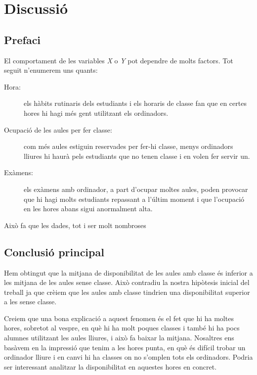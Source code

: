 \section{Discussió}
\subsection{Prefaci}
El comportament de les variables \emph{X} o \emph{Y} pot dependre de molts factors. Tot seguit n'enumerem uns quants:
\begin{description}
	\item[Hora:] els hàbits rutinaris dels estudiants i els horaris de classe fan que en certes hores hi hagi més gent utilitzant els ordinadors.
	\item[Ocupació de les aules per fer classe:] com més aules estiguin reservades per fer-hi classe, menys ordinadors lliures hi haurà pels estudiants que no tenen classe i en volen fer servir un.
	\item[Exàmens:] els exàmens amb ordinador, a part d'ocupar moltes aules, poden provocar que hi hagi molts estudiants repassant a l'últim moment i que l'ocupació en les hores abans sigui anormalment alta.
\end{description}
Això fa que les dades, tot i ser molt nombroses

\subsection{Conclusió principal}
Hem obtingut que la mitjana de disponibilitat de les aules amb classe és inferior a les mitjana de les aules sense classe. Això contradiu la nostra hipòtesis inicial del treball ja que crèiem que les aules amb classe tindrien una disponibilitat superior a les sense classe. 

Creiem que una bona explicació a aquest fenomen és el fet que hi ha moltes hores, sobretot al vespre, en què hi ha molt poques classes i també hi ha pocs alumnes utilitzant les aules lliures, i això fa baixar la mitjana. Nosaltres ens basàvem en la impressió que tenim a les hores punta, en què és difícil trobar un ordinador lliure i en canvi hi ha classes on no s'omplen tots els ordinadors. Podria ser interessant analitzar la disponibilitat en aquestes hores en concret.